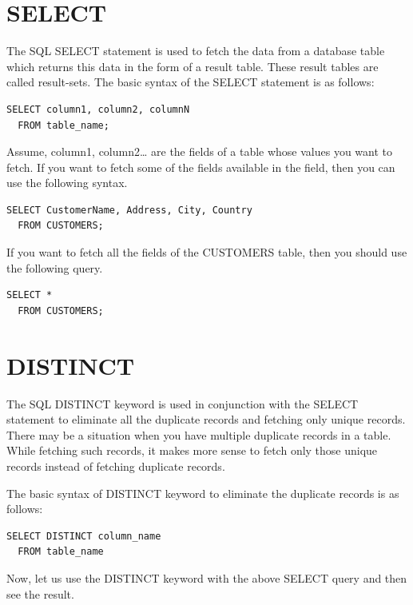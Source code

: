\documentclass[
]{book}
\begin{document}
\hypertarget{select-1}{%
\section{SELECT}\label{select-1}}

The SQL SELECT statement is used to fetch the data from a database table which returns this data in the form of a result table. These result tables are called result-sets. The basic syntax of the SELECT statement is as follows:

\begin{verbatim}
SELECT column1, column2, columnN 
  FROM table_name;
\end{verbatim}

Assume, column1, column2\ldots{} are the fields of a table whose values you want to fetch. If you want to fetch some of the fields available in the field, then you can use the following syntax.

\begin{verbatim}
SELECT CustomerName, Address, City, Country 
  FROM CUSTOMERS;
\end{verbatim}

If you want to fetch all the fields of the CUSTOMERS table, then you should use the following query.

\begin{verbatim}
SELECT *
  FROM CUSTOMERS;
\end{verbatim}

\hypertarget{distinct}{%
\section{DISTINCT}\label{distinct}}

The SQL DISTINCT keyword is used in conjunction with the SELECT statement to eliminate all the duplicate records and fetching only unique records. There may be a situation when you have multiple duplicate records in a table. While fetching such records, it makes more sense to fetch only those unique records instead of fetching duplicate records.

The basic syntax of DISTINCT keyword to eliminate the duplicate records is as follows:

\begin{verbatim}
SELECT DISTINCT column_name
  FROM table_name
\end{verbatim}

Now, let us use the DISTINCT keyword with the above SELECT query and then see the result.
\end{document}
